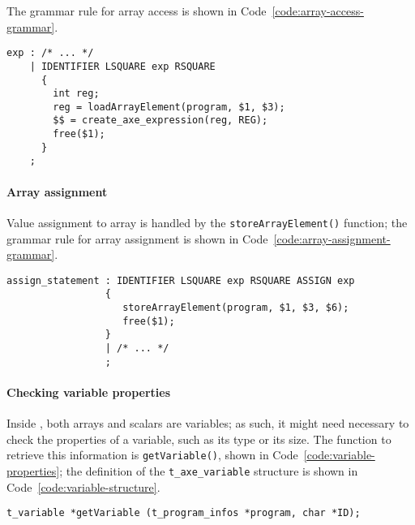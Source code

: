 \documentclass[english]{article}
\begin{document}
The grammar rule for array access is shown in Code~\ref{code:array-access-grammar}.

\begin{onepage}
  \begin{lstlisting}[language=LANCE, caption={Array access grammar}, label={code:array-access-grammar}]
exp : /* ... */
    | IDENTIFIER LSQUARE exp RSQUARE
      {
        int reg;
        reg = loadArrayElement(program, $1, $3);
        $$ = create_axe_expression(reg, REG);
        free($1);
      }
    ;
\end{lstlisting}
\end{onepage}

\paragraph{Array assignment}

Value assignment to array is handled by the \texttt{storeArrayElement()} function;
the grammar rule for array assignment is shown in Code~\ref{code:array-assignment-grammar}.

\begin{onepage}
  \begin{lstlisting}[language=LANCE, caption={Array assignment grammar}, label={code:array-assignment-grammar}]
assign_statement : IDENTIFIER LSQUARE exp RSQUARE ASSIGN exp
                 {
                    storeArrayElement(program, $1, $3, $6);
                    free($1);
                 }
                 | /* ... */
                 ;
\end{lstlisting}
\end{onepage}

\paragraph{Checking variable properties}

Inside \acse, both arrays and scalars are variables;
as such, it might need necessary to check the properties of a variable, such as its type or its size.
The function to retrieve this information is \texttt{getVariable()}, shown in Code~\ref{code:variable-properties};
the definition of the \texttt{t\_axe\_variable} structure is shown in Code~\ref{code:variable-structure}.

\begin{onepage}
  \begin{lstlisting}[language=LANCE, caption={Variable properties}, label={code:variable-properties}]
t_variable *getVariable (t_program_infos *program, char *ID);
\end{lstlisting}
\end{onepage}
\end{document}
